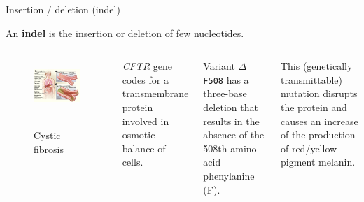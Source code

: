 \begin{frame}{Insertion / deletion (indel)}
	\bigskip

	An \textbf{indel} is the insertion or deletion of few nucleotides.

 	\begin{columns}


                \begin{figure}
                        \includegraphics[width=1\textwidth]{Pics/cystic_fibrosis} \
                        \caption{Cystic fibrosis}
                \end{figure}


		\small

		\textit{CFTR} gene codes for a transmembrane protein involved in osmotic balance of cells.

		\bigskip

		Variant \texttt{$\Delta$F508} has a three-base deletion that results in the 
		absence of the 508th amino acid phenylanine (F).

                \bigskip

                This (genetically transmittable) mutation disrupts the protein and causes an 
		increase of the production of red/yellow pigment melanin.

        \end{columns}

\end{frame}


